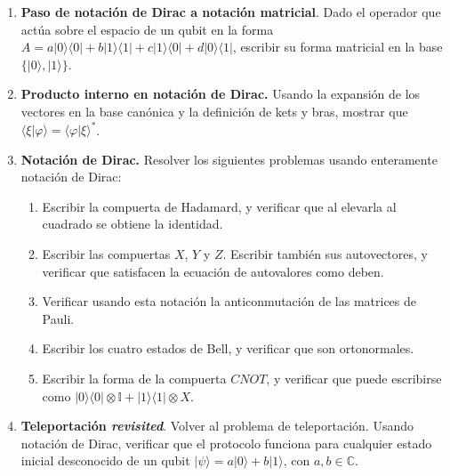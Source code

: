 \documentclass[a4paper,11pt,spanish]{article}
\newcommand{\ket}[1]{|#1\rangle}
\newcommand{\bra}[1]{\langle #1|}
\newcommand{\braket}[2]{\langle #1|#2\rangle}
\newcommand{\ketbra}[2]{\ket{#1}\bra{#2}}
\newcommand{\proj}[1]{\ketbra {#1}{#1}}
\begin{document}
\begin{enumerate}

 \item {\bf Paso de notación de Dirac a notaci\'on matricial}. Dado el operador que act\'ua sobre el espacio de un qubit en la forma $A=a\ketbra{0}{0} + b \ketbra{1}{1} + c \ketbra{1}{0} + d \ketbra{0}{1}$, escribir su forma matricial en la base $\{\ket{0}, \ket{1}\}$.

 \item {\bf Producto interno en notación de Dirac.} Usando la expansión de los vectores en la base canónica y la definición de kets y bras, mostrar que $\braket{\xi}{\varphi} = \braket{\varphi}{\xi}^*$.

 \item {\bf Notaci\'on de Dirac.} Resolver los siguientes problemas usando enteramente notaci\'on de Dirac:

 \begin{enumerate}
   \item Escribir la compuerta de Hadamard, y verificar que al elevarla al cuadrado se obtiene la identidad.

   \item Escribir las compuertas $X$, $Y$ y $Z$. Escribir tambi\'en sus autovectores, y verificar que satisfacen la ecuaci\'on de autovalores como deben.

   \item Verificar usando esta notación la anticonmutación de las matrices de Pauli.

   \item Escribir los cuatro estados de Bell, y verificar que son ortonormales.

   \item Escribir la forma de la compuerta $CNOT$, y verificar que puede escribirse como $\proj{0}\otimes\mathbb{I} + \proj{1} \otimes X$.

 \end{enumerate}

 \item \textbf{Teleportaci\'on \textit{revisited}}. Volver al problema de teleportaci\'on. Usando notaci\'on de Dirac, verificar que el protocolo funciona para cualquier estado inicial desconocido de un qubit $\ket{\psi}=a\ket{0}+b\ket{1}$, con $a,b\in \mathbb{C}$.


\end{enumerate}
\end{document}
